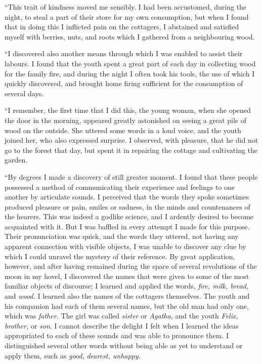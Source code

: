 \documentclass[12pt,openright]{book}
\begin{document}
“This trait of kindness moved me sensibly. I had been accustomed, during the night, to steal a part of their store for my own consumption, but when I found that in doing this I inflicted pain on the cottagers, I abstained and satisfied myself with berries, nuts, and roots which I gathered from a neighbouring wood.

“I discovered also another means through which I was enabled to assist their labours. I found that the youth spent a great part of each day in collecting wood for the family fire, and during the night I often took his tools, the use of which I quickly discovered, and brought home firing sufficient for the consumption of several days.

“I remember, the first time that I did this, the young woman, when she opened the door in the morning, appeared greatly astonished on seeing a great pile of wood on the outside. She uttered some words in a loud voice, and the youth joined her, who also expressed surprise. I observed, with pleasure, that he did not go to the forest that day, but spent it in repairing the cottage and cultivating the garden.

“By degrees I made a discovery of still greater moment. I found that these people possessed a method of communicating their experience and feelings to one another by articulate sounds. I perceived that the words they spoke sometimes produced pleasure or pain, smiles or sadness, in the minds and countenances of the hearers. This was indeed a godlike science, and I ardently desired to become acquainted with it. But I was baffled in every attempt I made for this purpose. Their pronunciation was quick, and the words they uttered, not having any apparent connection with visible objects, I was unable to discover any clue by which I could unravel the mystery of their reference. By great application, however, and after having remained during the space of several revolutions of the moon in my hovel, I discovered the names that were given to some of the most familiar objects of discourse; I learned and applied the words, \textit{fire, milk, bread,} and \textit{wood.} I learned also the names of the cottagers themselves. The youth and his companion had each of them several names, but the old man had only one, which was \textit{father.} The girl was called \textit{sister} or \textit{Agatha,} and the youth \textit{Felix, brother,} or \textit{son}. I cannot describe the delight I felt when I learned the ideas appropriated to each of these sounds and was able to pronounce them. I distinguished several other words without being able as yet to understand or apply them, such as \textit{good,}\textit{ }\textit{dearest, unhappy.}
\end{document}
